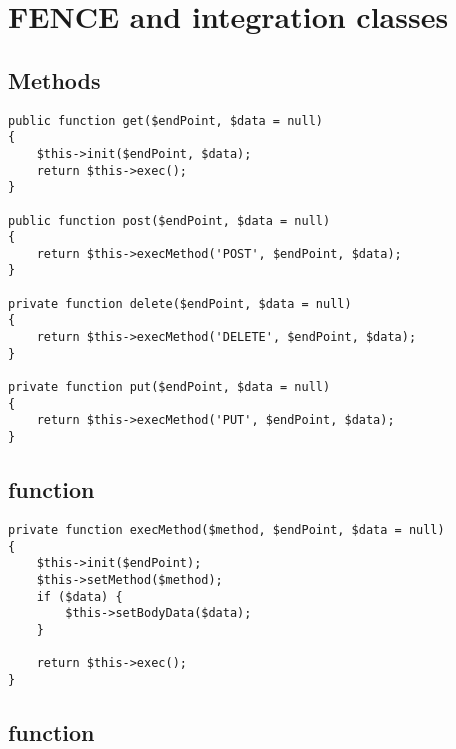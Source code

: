 \section{FENCE and \gitlab integration classes}%
\label{app:fence:gitlab}

\subsection{Methods}
\label{app:fence:gitlab:methods}

\begin{lstlisting}
public function get($endPoint, $data = null)
{
    $this->init($endPoint, $data);
    return $this->exec();
}

public function post($endPoint, $data = null)
{
    return $this->execMethod('POST', $endPoint, $data);
}

private function delete($endPoint, $data = null)
{
    return $this->execMethod('DELETE', $endPoint, $data);
}

private function put($endPoint, $data = null)
{
    return $this->execMethod('PUT', $endPoint, $data);
}
\end{lstlisting}


\subsection{ function}
\label{app:fence:gitlab:execmethod}

\begin{lstlisting}
private function execMethod($method, $endPoint, $data = null)
{
    $this->init($endPoint);
    $this->setMethod($method);
    if ($data) {
        $this->setBodyData($data);
    }

    return $this->exec();
}
\end{lstlisting}


\subsection{ function}
\label{app:fence:gitlab:createproject}

